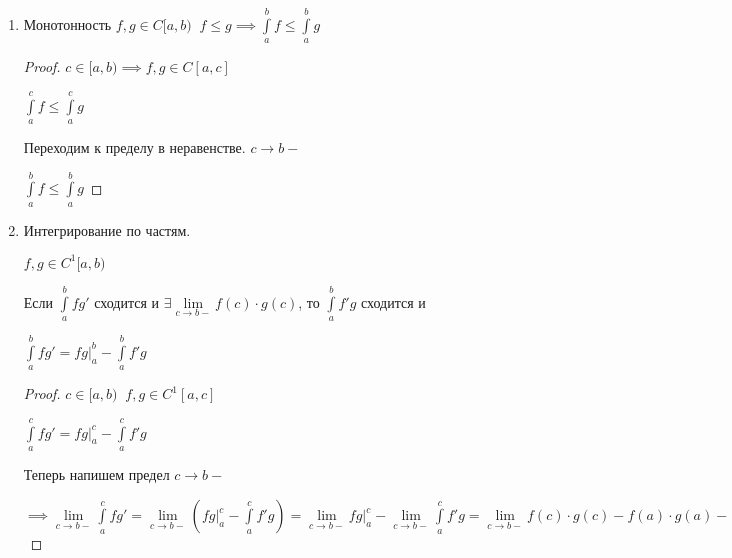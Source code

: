 \begin{properties}
\begin{enumerate}
\begin{proof}
			$\implies$ предел существует, конечен $\implies$ интеграл сходится и
			
			$\int\limits_a^b(\alpha f + \beta g)= \alpha \int\limits_a^b f +\beta \int\limits_a^b g$ 
		\end{proof}
	
		\begin{remark}\slashns
		
			$\int\limits_a^b f$ сходится $\int\limits_a^b g$ расходится $\implies \int\limits_a^b (f \pm g)$ расходится. 
		
			Доказательство -- от противного.
		\end{remark}
	
		\item
		Монотонность $f, g \in C[a,b) \;\; f\le g \implies \int\limits_a^b f \le \int\limits_a^b g$
	
		\begin{proof}\slashns
		
			$c \in [a,b) \implies f,g \in C[a,c]$
			
			$\int\limits_a^c f \le \int\limits_a^c g$
			
			Переходим к пределу в неравенстве. $c \to b-$
			
			$\int\limits_a^b f \le \int\limits_a^b g$
			
		\end{proof}
		
		\item Интегрирование по частям.  
		
		$f, g \in C^1[a,b)$
		
		Если $\int\limits_a^b fg'$ сходится и $\exists \lim\limits_{c \to b-} f(c)\cdot g(c)$, то $\int\limits_a^b f'g$ сходится и
		
		$\int\limits_a^b fg' = fg \Big|_a^b - \int\limits_a^b f'g$
		
		\begin{proof}\slashns
			
			$c \in [a,b) \;\; f,g \in C^1[a,c]$
			
			$\int\limits_{a}^{c} fg' =  fg\Big|_a^c - \int\limits_a^c f'g$
			
			Теперь напишем предел $c \to b-$
			
			$\implies \lim\limits_{c \to b-} \int\limits_a^c fg' = \lim\limits_{c \to b-} (fg\Big|_a^c - \int\limits_a^c f'g) =
			 \lim\limits_{c \to b-} fg\Big|_a^c - \lim\limits_{c \to b-}\int\limits_a^c f'g =  \lim\limits_{c \to b-} f(c)\cdot g(c) - f(a) \cdot g(a) -  \int\limits_a^b f'g$
			

\end{proof}
\end{enumerate}
\end{properties}
